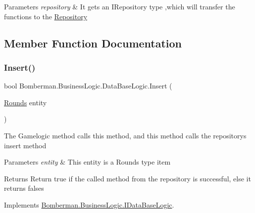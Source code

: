 \begin{DoxyParams}{Parameters}
{\em repository} & It gets an I\+Repository type ,which will transfer the functions to the \mbox{\hyperlink{namespace_bomberman_1_1_repository}{Repository}}\\
\hline
\end{DoxyParams}


\subsection{Member Function Documentation}
\mbox{\label{class_bomberman_1_1_business_logic_1_1_data_base_logic_a6a7ca20f6210022d6b45d3aba0e17a62}} 
\subsubsection{\texorpdfstring{Insert()}{Insert()}}
{\footnotesize\ttfamily bool Bomberman.\+Business\+Logic.\+Data\+Base\+Logic.\+Insert (\begin{DoxyParamCaption}\item[{\mbox{\hyperlink{class_bomberman_1_1_data_1_1_rounds}{Rounds}}}]{entity }\end{DoxyParamCaption})\hspace{0.3cm}{\ttfamily [inline]}}



The Gamelogic method calls this method, and this method calls the repository\textquotesingle{}s insert method 


\begin{DoxyParams}{Parameters}
{\em entity} & This entity is a Rounds type item\\
\hline
\end{DoxyParams}
\begin{DoxyReturn}{Returns}
Return true if the called method from the repository is successful, else it returns falses
\end{DoxyReturn}


Implements \mbox{\hyperlink{interface_bomberman_1_1_business_logic_1_1_i_data_base_logic_a1b8fde3e85c9ba91acbf4185a227f23b}{Bomberman.\+Business\+Logic.\+I\+Data\+Base\+Logic}}.

\mbox{\label{class_bomberman_1_1_business_logic_1_1_data_base_logic_a7535cc3e0b6ea882d06a83a07ab4e083}} 
